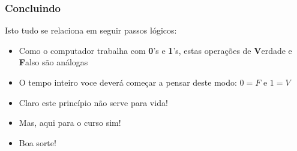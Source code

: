 \documentclass{beamer}
\begin{document}
\begin{frame}
\frametitle{Concluindo}


\begin{block}{Isto tudo se relaciona em seguir passos lógicos: }

\begin{itemize}

  \item Como o computador trabalha com \textbf{0}'s e \textbf{1}'s, estas operações de \textbf{V}erdade e \textbf{F}also são análogas
  \pause
    \item O tempo inteiro voce deverá começar a pensar deste modo: $0 = F$ e $1 = V$
      \pause
    \item Claro este princípio não serve para vida!
      \pause
    \item Mas, aqui para o curso sim!
      \pause
    \item Boa sorte!

\end{itemize}

  \end{block}


\end{frame}
\end{document}
